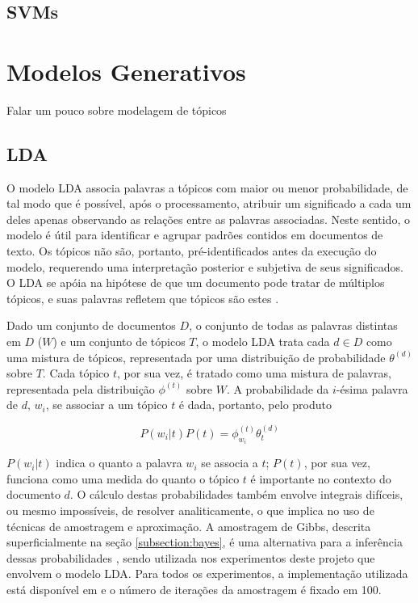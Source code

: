\subsection{SVMs}

\section{Modelos Generativos}

Falar um pouco sobre modelagem de tópicos

\subsection{LDA}

O modelo LDA associa palavras a tópicos com maior ou menor probabilidade, de tal modo que é possível, após o processamento, atribuir um significado a cada um deles apenas observando as relações entre as palavras associadas. Neste sentido, o modelo é útil para identificar e agrupar padrões contidos em documentos de texto. Os tópicos não são, portanto, pré-identificados antes da execução do modelo, requerendo uma interpretação posterior e subjetiva de seus significados. O LDA se apóia na hipótese de que um documento pode tratar de múltiplos tópicos, e suas palavras refletem que tópicos são estes \cite{pnas}. 

Dado um conjunto de documentos \ensuremath{D}, o conjunto de todas as palavras distintas em \ensuremath{D} (\ensuremath{W}) e um conjunto de tópicos \ensuremath{T}, o modelo LDA trata cada \ensuremath{d \in D} como uma mistura de tópicos, representada por uma distribuição de probabilidade \ensuremath{\theta^{(d)}} sobre \ensuremath{T}. Cada tópico \ensuremath{t}, por sua vez, é tratado como uma mistura de palavras, representada pela distribuição  \ensuremath{\phi^{(t)}} sobre \ensuremath{W}. A probabilidade da \ensuremath{i}-ésima palavra de \ensuremath{d}, \ensuremath{w_i}, se associar a um tópico \ensuremath{t} é dada, portanto, pelo produto \cite{pnas}

\begin{equation}
\label{eq2}
\ensuremath{P(w_i | t)P(t) = \phi^{(t)}_{w_i}\theta^{(d)}_{t}}
\end{equation}

\ensuremath{P(w_i | t)} indica o quanto a palavra \ensuremath{w_i} se associa a \ensuremath{t}; \ensuremath{P(t)}, por sua vez, funciona como uma medida do quanto o tópico \ensuremath{t} é importante no contexto do documento \ensuremath{d}. O cálculo destas probabilidades também envolve integrais difíceis, ou mesmo impossíveis, de resolver analiticamente, o que implica no uso de técnicas de amostragem e aproximação. A amostragem de Gibbs, descrita superficialmente na seção \ref{subsection:bayes}, é uma alternativa para a inferência dessas probabilidades \cite{lingpipe-lda}, sendo utilizada nos experimentos deste projeto que envolvem o modelo LDA. Para todos os experimentos, a implementação utilizada está disponível em \cite{top-lda} e o número de iterações da amostragem é fixado em 100.

